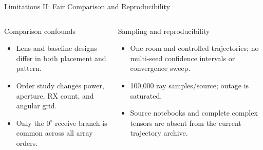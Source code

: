 \begin{frame}[t]{Limitations II: Fair Comparison and Reproducibility}
\scriptsize
\begin{columns}[T,onlytextwidth]
  \begin{block}{Comparison confounds}
    \begin{itemize}
      \setlength{\itemsep}{0.15em}
      \item Lens and baseline designs differ in both placement and pattern.
      \item Order study changes power, aperture, RX count, and angular grid.
      \item Only the $0^\circ$ receive branch is common across all array orders.
    \end{itemize}
  \end{block}

  \begin{block}{Sampling and reproducibility}
    \begin{itemize}
      \setlength{\itemsep}{0.15em}
      \item One room and controlled trajectories; no multi-seed confidence
            intervals or convergence sweep.
      \item 100{,}000 ray samples/source; outage is saturated.
      \item Source notebooks and complete complex tensors are absent from the
            current trajectory archive.
    \end{itemize}
  \end{block}
\end{columns}
\end{frame}



